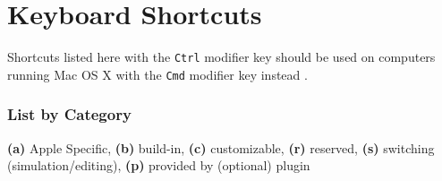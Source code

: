 \chapter{Keyboard Shortcuts}
\label{sec:keyboard-shortcuts}
\vspace*{-5mm}
Shortcuts listed here with the \texttt{Ctrl} modifier key should be
used on computers running Mac OS X with the \texttt{Cmd} modifier key
instead .

\subsection*{List by Category}

\textbf{(a)} Apple Specific, \textbf{(b)} build-in, \textbf{(c)} customizable,
\textbf{(r)} reserved, \textbf{(s)} switching (simulation/editing), \textbf{(p)}
provided by (optional) plugin
